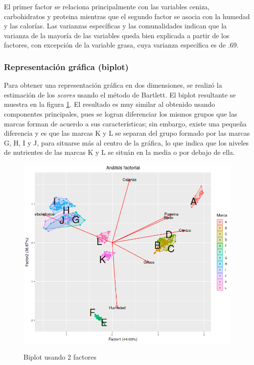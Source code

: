El primer factor se relaciona principalmente con las variables ceniza, carbohidratos y proteina mientras que el segundo factor se asocia con la humedad y las calorías. Las varianzas específicas y las comunalidades indican que la varianza de la mayoría de las variables queda bien explicada a partir de los factores, con excepción de la variable grasa, cuya varianza específica es de $.69$.

\subsubsection{Representación gráfica (biplot)}

Para obtener una representación gráfica en dos dimensiones, se realizó la estimación de los \textit{scores} usando el método de Bartlett. El biplot resultante se muestra en la figura \ref{i_biplot_Factores}. El resultado es muy similar al obtenido usando componentes principales, pues se logran diferenciar los mismos grupos que las marcas forman de acuerdo a sus características; sin embargo, existe una pequeña diferencia y es que las marcas K y L se separan del grupo formado por las marcas G, H, I y J, para situarse más al centro de la gráfica, lo que indica que los niveles de nutrientes de las marcas K y L se situán en la media o por debajo de ella.

\begin{figure}[h]
\centering
	\includegraphics[scale=.75]{images/biplotFactores.png} 
	\label{i_biplot_Factores}
	\caption{Biplot usando 2 factores}
\end{figure}